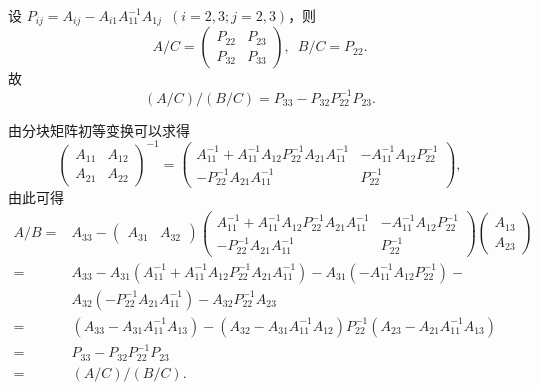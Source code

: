 \documentclass[12pt,fontset=fandol]{ctexart}
\begin{document}
\begin{solve}
                设 $P_{ij} = A_{ij} - A_{i1} A_{11}^{-1} A_{1j} \enspace (i=2,3; j=2,3)$，则
                \[
                    A/C = \begin{pmatrix}
                        P_{22} & P_{23} \\
                        P_{32} & P_{33}
                    \end{pmatrix}, \enspace
                    B/C = P_{22}.
                \]
                故
                \[
                    (A/C)/(B/C) = P_{33} - P_{32} P_{22}^{-1} P_{23}.
                \]

                由分块矩阵初等变换可以求得
                \[
                    \begin{pmatrix}
                        A_{11} & A_{12} \\
                        A_{21} & A_{22}
                    \end{pmatrix}^{-1} = \begin{pmatrix}
                        A_{11}^{-1} + A_{11}^{-1} A_{12} P_{22}^{-1} A_{21} A_{11}^{-1} & -A_{11}^{-1} A_{12} P_{22}^{-1} \\
                        -P_{22}^{-1} A_{21} A_{11}^{-1} & P_{22}^{-1}
                    \end{pmatrix},
                \]
                由此可得
                \begin{align*}
                    A/B = {} & A_{33} - \begin{pmatrix}
                        A_{31} & A_{32}
                    \end{pmatrix} \begin{pmatrix}
                        A_{11}^{-1} + A_{11}^{-1} A_{12} P_{22}^{-1} A_{21} A_{11}^{-1} & -A_{11}^{-1} A_{12} P_{22}^{-1} \\
                        -P_{22}^{-1} A_{21} A_{11}^{-1} & P_{22}^{-1}
                    \end{pmatrix} \begin{pmatrix}
                        A_{13} \\ A_{23}
                    \end{pmatrix} \\
                    = {} & A_{33} - A_{31} \left(A_{11}^{-1} + A_{11}^{-1} A_{12} P_{22}^{-1} A_{21} A_{11}^{-1}\right) - A_{31} \left(-A_{11}^{-1} A_{12} P_{22}^{-1}\right) - \\
                      {} & A_{32} \left(-P_{22}^{-1} A_{21} A_{11}^{-1}\right) - A_{32} P_{22}^{-1} A_{23} \\
                    = {} & \left(A_{33} - A_{31} A_{11}^{-1} A_{13}\right) - \left(A_{32} - A_{31} A_{11}^{-1} A_{12}\right) P_{22}^{-1} \left(A_{23} - A_{21} A_{11}^{-1} A_{13}\right) \\
                    = {} & P_{33} - P_{32} P_{22}^{-1} P_{23} \\
                    = {} & (A/C)/(B/C).
                \end{align*}
\end{solve}
\end{document}
